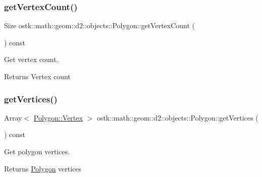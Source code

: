 \subsubsection{\texorpdfstring{get\+Vertex\+Count()}{getVertexCount()}}
{\footnotesize\ttfamily Size ostk\+::math\+::geom\+::d2\+::objects\+::\+Polygon\+::get\+Vertex\+Count (\begin{DoxyParamCaption}{ }\end{DoxyParamCaption}) const}



Get vertex count. 

\begin{DoxyReturn}{Returns}
Vertex count 
\end{DoxyReturn}
\mbox{\label{classostk_1_1math_1_1geom_1_1d2_1_1objects_1_1_polygon_a04a97204d397a1c7a919ebf4d73fb537}} 
\subsubsection{\texorpdfstring{get\+Vertices()}{getVertices()}}
{\footnotesize\ttfamily Array$<$ \hyperlink{classostk_1_1math_1_1geom_1_1d2_1_1objects_1_1_polygon_a2fdf6254b42f087bd9cd0b8b0d7df91c}{Polygon\+::\+Vertex} $>$ ostk\+::math\+::geom\+::d2\+::objects\+::\+Polygon\+::get\+Vertices (\begin{DoxyParamCaption}{ }\end{DoxyParamCaption}) const}



Get polygon vertices. 

\begin{DoxyReturn}{Returns}
\hyperlink{classostk_1_1math_1_1geom_1_1d2_1_1objects_1_1_polygon}{Polygon} vertices 
\end{DoxyReturn}
\mbox{\label{classostk_1_1math_1_1geom_1_1d2_1_1objects_1_1_polygon_ad0183cbb840fe9f1fb9dfde0cc3eae50}} 
